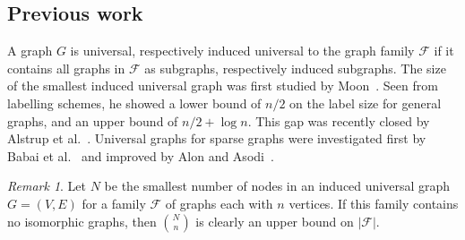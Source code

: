 \documentclass{article}
\theoremstyle{remark}
\newtheorem{remark}{Remark}
\begin{document}
\subsection{Previous work}
A  graph  $G$ is universal, respectively induced universal to the graph family $\mathcal{F}$ if it contains all graphs in  $\mathcal{F}$  as subgraphs, respectively induced subgraphs.
The size of the smallest induced universal graph was first studied by  Moon~\cite{moon1965minimal}. Seen from labelling schemes, he showed a lower bound of $n/2$ on the label size for general graphs, and an upper bound of  $n/2+ \log n$. This gap was recently closed by Alstrup et al.~\cite{alstrup2014adjacency}.
Universal graphs for sparse graphs were investigated first by Babai et al.~\cite{babai1982graphs} and improved by Alon and Asodi~\cite{Alon2002universal}. 
\begin{remark}
Let $N$ be the smallest number of nodes in an induced universal graph $G=(V,E)$ for a family $\mathcal{F}$ of graphs each with $n$ vertices.
If this family contains no isomorphic graphs, then ${N}\choose{n}$ is clearly an upper bound on $\vert \mathcal{F} \vert$.
\end{remark}
%
\end{document}
